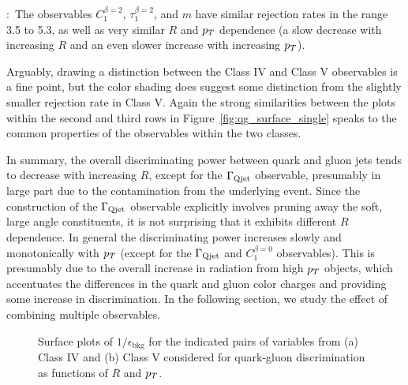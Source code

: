 :~The observables $C_1^{\beta=2}$, $\tau_1^{\beta=2}$, and $m$ have similar rejection rates in the 
range 3.5 to 5.3, as well as very similar $R$ and $p_T$ dependence (a slow decrease with increasing $R$ and an even
slower increase with increasing $p_T$).  

Arguably, drawing a distinction between the Class IV and Class V observables is a fine point, 
but the color shading does suggest some
distinction from the slightly smaller rejection rate in Class V.  Again the strong similarities between the plots within the second and third rows in 
Figure~\ref{fig:qg_surface_single} speaks to the common properties of the observables within the two classes.





In summary, the overall discriminating power between quark and gluon jets tends to
 decrease with increasing $R$, except for the $\Gamma_{\rm Qjet}$ observable, presumably in large part due to the
 contamination from the underlying event. Since the construction of the $\Gamma_{\rm Qjet}$ observable explicitly
involves pruning away the soft, large angle constituents, it is not surprising that it exhibits different $R$ dependence. 
In general the discriminating power increases slowly and monotonically
with $p_T$ (except for the $\Gamma_{\rm Qjet}$ and $C_1^{\beta=0}$ observables). This is presumably due to the overall
increase in radiation from high $p_T$ objects, which accentuates the differences in the quark and gluon color charges and 
 providing some increase in discrimination.  
In the following section, we study the effect of combining multiple observables.

%
\begin{figure}
\centering
{}
\caption{Surface plots of $1/\epsilon_\text{bkg}$ for the indicated pairs of variables from (a) Class IV and (b) Class V considered for
  quark-gluon discrimination as functions of $R$ and $p_T$. }
\label{fig:qg_surface_pairA}
\end{figure}
%


